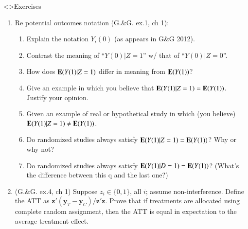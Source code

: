 \begin{frame}<\nottheirhandout>{Exercises}
  \begin{enumerate}
  \item Re potential outcomes notation {}(G.\&G. ex.1, ch 1):
    \begin{enumerate}
    \item Explain the notation $Y_{i}(0)$ (as appears in G\&G 2012).
    \item Contrast the meaning of ``$Y(0) | Z=1$'' w/ that of ``$Y(0) | Z=0$''.
    \item How does $\mathbf{E}(Y(1) | Z=1)$ differ in meaning from $\mathbf{E}(Y(1))$?
    \item Give an example in which you believe that $\mathbf{E}(Y(1) | Z=1) =
      \mathbf{E}(Y(1))$.  Justify your opinion. 
    \item Given an example of real or hypothetical study in which (you
      believe)$\mathbf{E}(Y(1) | Z=1) \neq \mathbf{E}(Y(1))$.
    \item Do randomized studies always satisfy $\mathbf{E}(Y(1) | Z=1)
      = \mathbf{E}(Y(1))$?  Why or why not?
    \item Do randomized studies always satisfy $\mathbf{E}(Y(1) | D=1)
      = \mathbf{E}(Y(1))$?  (What's the difference between this q and
      the last one?)
    \end{enumerate}
\item (G.\&G. ex.4, ch 1) Suppose $z_{i} \in \{0,1\}$, all $i$; assume non-interference. Define the ATT as $\mathbf{z}'(\mathbf{y}_{T}-\mathbf{y}_{C})/\mathbf{z}'\mathbf{z}$.  Prove that if treatments are allocated using complete random assignment, then the ATT is equal in expectation to the average treatment effect.
  \end{enumerate}

\end{frame}



